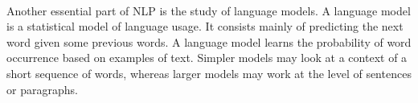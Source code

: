 



\paragraph{}
Another essential part of NLP is the study of language models. A language model is a statistical model of language usage. It consists mainly of predicting the next word given some previous words. A language model learns the probability of word occurrence based on examples of text. Simpler models may look at a context of a short sequence of words, whereas larger models may work at the level of sentences or paragraphs.

